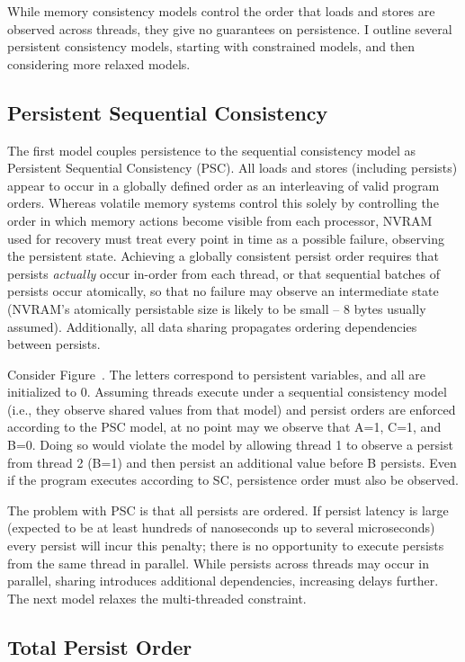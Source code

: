 While memory consistency models control the order that loads and stores are observed across threads, they give no guarantees on persistence.
I outline several persistent consistency models, starting with constrained models, and then considering more relaxed models.

\subsection{Persistent Sequential Consistency}
\label{sec:PMC:PersistenceModels:PSC}

The first model couples persistence to the sequential consistency model as Persistent Sequential Consistency (PSC).
All loads and stores (including persists) appear to occur in a globally defined order as an interleaving of valid program orders.
Whereas volatile memory systems control this solely by controlling the order in which memory actions become visible from each processor, NVRAM used for recovery must treat every point in time as a possible failure, observing the persistent state.
Achieving a globally consistent persist order requires that persists \emph{actually} occur in-order from each thread, or that sequential batches of persists occur atomically, so that no failure may observe an intermediate state (NVRAM's atomically persistable size is likely to be small -- 8 bytes usually assumed).
Additionally, all data sharing propagates ordering dependencies between persists.

Consider Figure~.
The letters correspond to persistent variables, and all are initialized to 0.
Assuming threads execute under a sequential consistency model (i.e., they observe shared values from that model) and persist orders are enforced according to the PSC model, at no point may we observe that A=1, C=1, and B=0.
Doing so would violate the model by allowing thread 1 to observe a persist from thread 2 (B=1) and then persist an additional value before B persists.
Even if the program executes according to SC, persistence order must also be observed.

The problem with PSC is that all persists are ordered.
If persist latency is large (expected to be at least hundreds of nanoseconds up to several microseconds) every persist will incur this penalty; there is no opportunity to execute persists from the same thread in parallel.
While persists across threads may occur in parallel, sharing introduces additional dependencies, increasing delays further.
The next model relaxes the multi-threaded constraint.

\subsection{Total Persist Order}
\label{sec:PMC:PersistenceModels:TPO}
